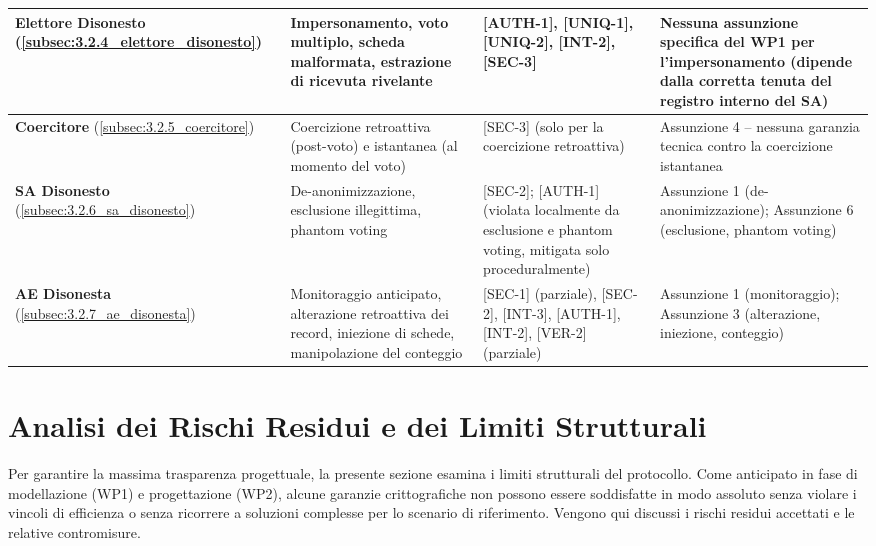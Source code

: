 \begin{longtable}{| p{2.1cm} | p{4.0cm} | p{2.8cm} | p{3.2cm} |}
    \textbf{Elettore Disonesto} \newline (\ref{subsec:3.2.4_elettore_disonesto})
    & Impersonamento, voto multiplo, scheda malformata, estrazione di ricevuta rivelante
    & [AUTH-1], [UNIQ-1], [UNIQ-2], [INT-2], [SEC-3]
    & Nessuna assunzione specifica del WP1 per l'impersonamento (dipende dalla corretta tenuta del registro interno del SA) \\
    \hline

    \textbf{Coercitore} \newline (\ref{subsec:3.2.5_coercitore})
    & Coercizione retroattiva (post-voto) e istantanea (al momento del voto)
    & [SEC-3] (solo per la coercizione retroattiva)
    & Assunzione 4 -- nessuna garanzia tecnica contro la coercizione istantanea \\
    \hline

    \textbf{SA Disonesto} \newline (\ref{subsec:3.2.6_sa_disonesto})
    & De-anonimizzazione, esclusione illegittima, phantom voting
    & [SEC-2]; [AUTH-1] (violata localmente da esclusione e phantom voting, mitigata solo proceduralmente)
    & Assunzione 1 (de-anonimizzazione); Assunzione 6 (esclusione, phantom voting) \\
    \hline

    \textbf{AE Disonesta} \newline (\ref{subsec:3.2.7_ae_disonesta})
    & Monitoraggio anticipato, alterazione retroattiva dei record, iniezione di schede, manipolazione del conteggio
    & [SEC-1] (parziale), [SEC-2], [INT-3], [AUTH-1], [INT-2], [VER-2] (parziale)
    & Assunzione 1 (monitoraggio); Assunzione 3 (alterazione, iniezione, conteggio) \\
    \hline

\end{longtable}

\section{Analisi dei Rischi Residui e dei Limiti Strutturali}
\label{sec:3.3_rischi_residui}

Per garantire la massima trasparenza progettuale, la presente sezione esamina i limiti strutturali del protocollo. Come anticipato in fase di modellazione (WP1) e progettazione (WP2), alcune garanzie crittografiche non possono essere soddisfatte in modo assoluto senza violare i vincoli di efficienza o senza ricorrere a soluzioni complesse per lo scenario di riferimento. Vengono qui discussi i rischi residui accettati e le relative contromisure.

